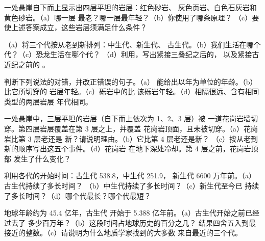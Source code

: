 \begin{exercise}[$\star$]\label{exo:g7:geological-time:2}
一处悬崖自下而上显示出四层平坦的岩层：红色砂岩、
灰色页岩、白色石灰岩和黄色砂岩。（a）哪一层
最老？哪一层最年轻？（b）你使用了哪条原理？
（c）要使上述答案成立，这些岩层须满足什么条件？
\end{exercise}

\begin{exercise}[$\star$]\label{exo:g7:geological-time:3}
（a）将三个代按从老到新排列：中生代、新生代、
古生代。（b）我们生活在哪个代？（c）恐龙生活在哪个代？
（d）利用，写出紧接三叠纪之后的，
以及紧接古近纪之前的
。
\end{exercise}

\begin{exercise}[$\star$]\label{exo:g7:geological-time:4}
判断下列说法的对错，并改正错误的句子。（a）
能给出以年为单位的年龄。（b）比它所切穿的
岩层年轻。（c）砾岩中的比
该砾岩年轻。（d）相隔很远、含有相同类型的两层岩层
年代相同。
\end{exercise}

\begin{exercise}[$\star\star$]\label{exo:g7:geological-time:5}
一处悬崖中，三层平坦的岩层（自下而上依次为 1、2、3 层）被
一道花岗岩墙切穿。第四层岩层覆盖在第 3 层之上，并覆盖
花岗岩顶面，且未被切穿。（a）花岗岩比第 3 层老还是
新？请说明理由。（b）它比第 4 层老还是新？
（c）按从老到新的顺序写出这五个事件。（d）花岗岩
在地下深处冷却。第 4 层之前，花岗岩顶部
发生了什么变化？
\end{exercise}

\begin{exercise}[$\star\star$]\label{exo:g7:geological-time:6}
利用各代的开始时间：古生代 \num{538.8}，中生代 \num{251.9}，
新生代 6600 万年前。（a）古生代持续了多长时间？
（b）中生代持续了多长时间？（c）新生代至今已
持续了多长时间？（d）哪个代最长？哪个代最短？
\end{exercise}

\begin{exercise}[$\star\star$]\label{exo:g7:geological-time:7}
地球年龄约为 45.4 亿年，古生代
开始于 5.388 亿年前。（a）古生代开始之前已经过去了
多少百万年？（b）这段时间占地球历史的百分之几？
结果四舍五入到最接近的整数。（c）请说明为什么地质学家找到的大多数
来自最近的三个代。
\end{exercise}

